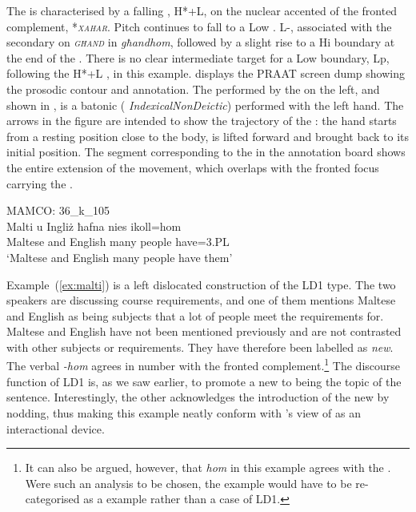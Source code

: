 \documentclass[output=paper]{LSP/langsci}
\begin{document}
The  is characterised by a falling , H*+L, on the
nuclear accented  of the fronted complement, *{\textit
  {\textsc {xahar}}}.  Pitch continues to fall to a Low 
. L-, associated with the secondary  on {\textit {\textsc
    {għand}}} in {\it għandhom}, followed by a slight rise to a Hi
boundary at the end of the . There is no clear intermediate
target for a Low boundary, Lp, following the H*+L , in
this example.  displays the
PRAAT screen dump showing the prosodic contour and annotation. The
 performed by the  on the left, and shown in
, is a batonic  ({\em
  IndexicalNonDeictic}) performed with the left hand.
The arrows in the figure are intended to show the trajectory of the
: the hand starts from a resting position close to the body, is
lifted forward and brought back to its initial position. The segment
corresponding to the  in the annotation board shows the entire
extension of the movement, which overlaps with
the fronted focus carrying the .


\ea\label{ex:malti}
{MAMCO: 36\_k\_105}\\
\gll Malti u Ingliż ħafna nies 	ikoll=hom\\
Maltese and English   many  people have=3.PL\\
\glt `Maltese and English many people have them'\\
\z



Example~(\ref{ex:malti}) is a left dislocated construction of the LD1
type. The two speakers are discussing course requirements, and one of
them mentions Maltese and English as being subjects that a lot of
people meet the requirements for. Maltese and English have not been
mentioned previously and are not contrasted with other subjects or
requirements. They have therefore been labelled as {\em new}. The
verbal  {\em -hom} agrees in number with the fronted
complement.\footnote{It can also be argued, however, that {\em hom} in
  this example agrees with the  . Were such an analysis
  to be chosen, the example would have to be re-categorised as a
   example rather than a case of LD1.} The discourse
function of LD1 is, as we saw earlier, to promote a new  to
being the topic of the sentence. Interestingly, the other 
acknowledges the introduction of the new  by nodding, thus
making this example neatly conform with \citet{geluykens1992}'s view
of  as an interactional device.
\end{document}

